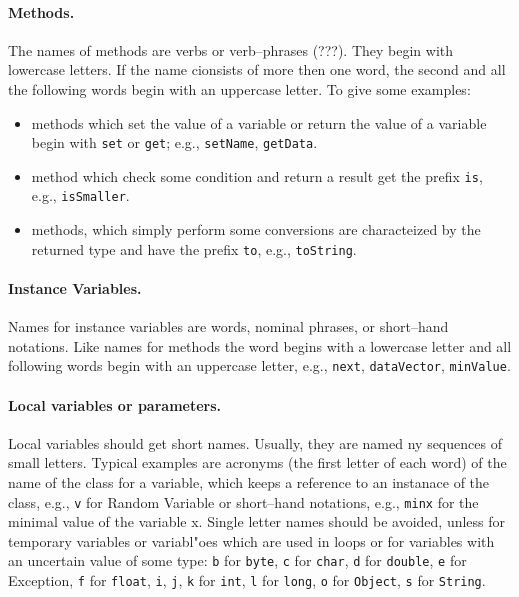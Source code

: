\paragraph{Methods.} The names of methods are verbs or verb--phrases
  (???). They begin with lowercase letters. If the name cionsists of
  more then one word, the second and all the following words begin
  with an uppercase letter. To give some examples:
\begin{itemize}
\item methods which set the value of a variable or return the value of
  a variable begin with \verb|set| or \verb|get|; e.g.,
  \verb|setName|, \verb|getData|.
\item method which check some condition and return a result  get the
  prefix \verb|is|, e.g., \verb|isSmaller|.
\item methods, which simply perform some conversions are characteized
  by the returned type and have the prefix \verb|to|, e.g.,
  \verb|toString|.
\end{itemize}

\paragraph{Instance Variables.} Names for instance variables are
  words, nominal phrases, or short--hand notations. Like names for
  methods the word begins with a lowercase letter and all following
  words begin with an uppercase letter, e.g., \verb|next|,
  \verb|dataVector|,
\verb|minValue|.

\paragraph{Local variables or parameters.} Local variables should get
  short  names. Usually, they are named ny sequences of small
  letters. Typical examples are acronyms (the first letter of each
  word) of the name of the class for a variable, which keeps a
  reference to an instanace of the class, e.g., \verb|v| for Random
  Variable or short--hand notations, e.g., \verb|minx| for the minimal
  value of the variable x. Single letter names should be avoided,
  unless for temporary variables or variabl"oes which are used in
  loops or for variables with an uncertain value of some type:
\verb|b| for \verb|byte|, \verb|c| for \verb|char|, \verb|d| for
  \verb|double|, \verb|e| for Exception, \verb|f| for \verb|float|,
  \verb|i|,
\verb|j|, \verb|k| for \verb|int|, \verb|l| for \verb|long|, \verb|o|
  for \verb|Object|, \verb|s| for \verb|String|.

